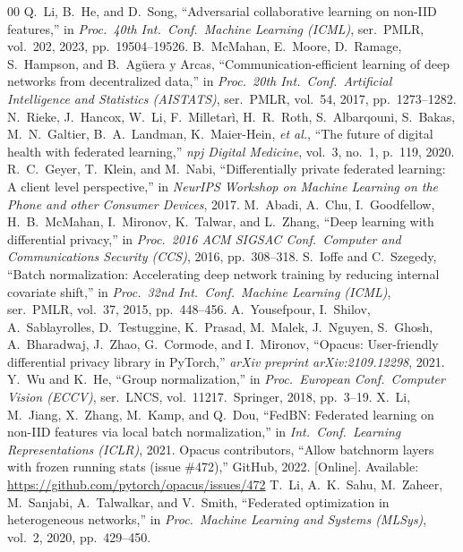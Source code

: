 \documentclass[conference]{IEEEtran}
\begin{document}
\begin{thebibliography}{00}
 Q.~Li, B.~He, and D.~Song, ``Adversarial collaborative learning on non-IID features,'' in \emph{Proc.\ 40th Int.\ Conf.\ Machine Learning (ICML)}, ser.\ PMLR, vol.~202, 2023, pp.\ 19504--19526.
 B.~McMahan, E.~Moore, D.~Ramage, S.~Hampson, and B.~Ag\"{u}era y Arcas, ``Communication-efficient learning of deep networks from decentralized data,'' in \emph{Proc.\ 20th Int.\ Conf.\ Artificial Intelligence and Statistics (AISTATS)}, ser.\ PMLR, vol.~54, 2017, pp.\ 1273--1282.
 N.~Rieke, J.~Hancox, W.~Li, F.~Milletar\`{i}, H.~R.~Roth, S.~Albarqouni, S.~Bakas, M.~N.~Galtier, B.~A.~Landman, K.~Maier-Hein, \emph{et al.}, ``The future of digital health with federated learning,'' \emph{npj Digital Medicine}, vol.~3, no.~1, p.~119, 2020.
 R.~C.~Geyer, T.~Klein, and M.~Nabi, ``Differentially private federated learning: A client level perspective,'' in \emph{NeurIPS Workshop on Machine Learning on the Phone and other Consumer Devices}, 2017.
 M.~Abadi, A.~Chu, I.~Goodfellow, H.~B.~McMahan, I.~Mironov, K.~Talwar, and L.~Zhang, ``Deep learning with differential privacy,'' in \emph{Proc.\ 2016 ACM SIGSAC Conf.\ Computer and Communications Security (CCS)}, 2016, pp.\ 308--318.
 S.~Ioffe and C.~Szegedy, ``Batch normalization: Accelerating deep network training by reducing internal covariate shift,'' in \emph{Proc.\ 32nd Int.\ Conf.\ Machine Learning (ICML)}, ser.\ PMLR, vol.~37, 2015, pp.\ 448--456.
 A.~Yousefpour, I.~Shilov, A.~Sablayrolles, D.~Testuggine, K.~Prasad, M.~Malek, J.~Nguyen, S.~Ghosh, A.~Bharadwaj, J.~Zhao, G.~Cormode, and I.~Mironov, ``Opacus: User-friendly differential privacy library in PyTorch,'' \emph{arXiv preprint arXiv:2109.12298}, 2021.
 Y.~Wu and K.~He, ``Group normalization,'' in \emph{Proc.\ European Conf.\ Computer Vision (ECCV)}, ser.\ LNCS, vol.~11217.\ Springer, 2018, pp.\ 3--19.
 X.~Li, M.~Jiang, X.~Zhang, M.~Kamp, and Q.~Dou, ``FedBN: Federated learning on non-IID features via local batch normalization,'' in \emph{Int.\ Conf.\ Learning Representations (ICLR)}, 2021.
 Opacus contributors, ``Allow batchnorm layers with frozen running stats (issue \#472),'' GitHub, 2022. [Online]. Available: \url{https://github.com/pytorch/opacus/issues/472}
 T.~Li, A.~K.~Sahu, M.~Zaheer, M.~Sanjabi, A.~Talwalkar, and V.~Smith, ``Federated optimization in heterogeneous networks,'' in \emph{Proc.\ Machine Learning and Systems (MLSys)}, vol.~2, 2020, pp.\ 429--450.

\end{thebibliography}
\end{document}
